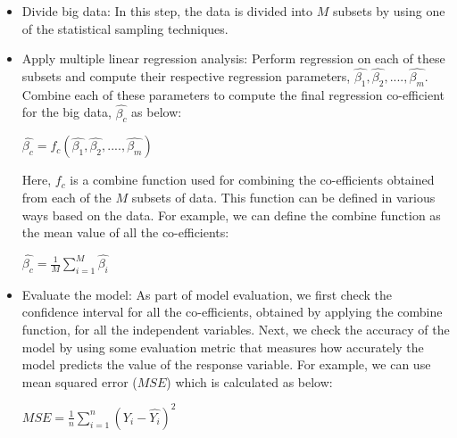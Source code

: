 \documentclass[sigconf]{acmart}
\begin{document}
\begin{itemize}
	\item Divide big data: In this step, the data is divided into $M$ subsets by using one of the statistical sampling techniques.
	\item Apply multiple linear regression analysis: Perform regression on each of these subsets and compute their respective regression parameters, $\hat{\beta_1}, \hat{\beta_2}, ...., \hat{\beta_m}$. Combine each of these parameters to compute the final regression co-efficient for the big data, $\hat{\beta_c}$ as below:
	\begin{center}$\hat{\beta_c} = f_c(\hat{\beta_1}, \hat{\beta_2}, ...., \hat{\beta_m})$\end{center}
	Here, $f_c$ is a combine function used for combining the co-efficients obtained from each of the $M$ subsets of data. This function can be defined in various ways based on the data. For example, we can define the combine function as the mean value of all the co-efficients: 
	\begin{center} $\hat{\beta_c} = \frac{1}{M}\sum_{i=1}^M \hat{\beta_i}$ \end{center}
	\item Evaluate the model: As part of model evaluation, we first check the confidence interval for all the co-efficients, obtained by applying the combine function, for all the independent variables. Next, we check the accuracy of the model by using some evaluation metric that measures how accurately the model predicts the value of the response variable. For example, we can use mean squared error ($MSE$) which is calculated as below:
	\begin{center} $MSE = \frac{1}{n}\sum_{i=1}^n (Y_i - \hat{Y_i})^2$ \end{center}
\end{itemize} 
\end{document}
